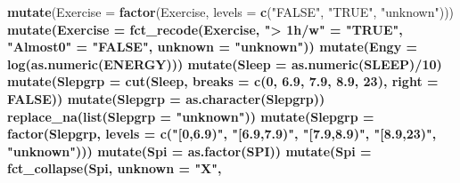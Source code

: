 \documentclass[]{article}
\newenvironment{Shaded}{\begin{snugshade}}{\end{snugshade}}
\newcommand{\CommentTok}[1]{\textcolor[rgb]{0.56,0.35,0.01}{\textit{#1}}}
\newcommand{\DataTypeTok}[1]{\textcolor[rgb]{0.13,0.29,0.53}{#1}}
\newcommand{\DecValTok}[1]{\textcolor[rgb]{0.00,0.00,0.81}{#1}}
\newcommand{\FloatTok}[1]{\textcolor[rgb]{0.00,0.00,0.81}{#1}}
\newcommand{\KeywordTok}[1]{\textcolor[rgb]{0.13,0.29,0.53}{\textbf{#1}}}
\newcommand{\NormalTok}[1]{#1}
\newcommand{\OperatorTok}[1]{\textcolor[rgb]{0.81,0.36,0.00}{\textbf{#1}}}
\newcommand{\OtherTok}[1]{\textcolor[rgb]{0.56,0.35,0.01}{#1}}
\newcommand{\StringTok}[1]{\textcolor[rgb]{0.31,0.60,0.02}{#1}}
\begin{document}
\begin{Shaded}
\begin{Highlighting}[]
{{{{{{{{{{{{{{{{{{{{{{{{{{{{{\StringTok{  }\KeywordTok{mutate}\NormalTok{(}\DataTypeTok{Exercise =} \KeywordTok{factor}\NormalTok{(Exercise, }\DataTypeTok{levels =} \KeywordTok{c}\NormalTok{(}\StringTok{"FALSE"}\NormalTok{, }\StringTok{"TRUE"}\NormalTok{, }\StringTok{"unknown"}\NormalTok{))) }\OperatorTok{%
\StringTok{  }\KeywordTok{mutate}\NormalTok{(}\DataTypeTok{Exercise =} \KeywordTok{fct_recode}\NormalTok{(Exercise, }
                               \StringTok{"> 1h/w"}\NormalTok{ =}\StringTok{ "TRUE"}\NormalTok{, }
                               \StringTok{"Almost0"}\NormalTok{ =}\StringTok{ "FALSE"}\NormalTok{, }
                               \DataTypeTok{unknown   =} \StringTok{"unknown"}\NormalTok{)) }\OperatorTok{%
\StringTok{  }\KeywordTok{mutate}\NormalTok{(}\DataTypeTok{Engy =} \KeywordTok{log}\NormalTok{(}\KeywordTok{as.numeric}\NormalTok{(ENERGY))) }\OperatorTok{%
\StringTok{  }\KeywordTok{mutate}\NormalTok{(}\DataTypeTok{Sleep =} \KeywordTok{as.numeric}\NormalTok{(SLEEP)}\OperatorTok{/}\DecValTok{10}\NormalTok{) }\OperatorTok{%
\StringTok{  }\KeywordTok{mutate}\NormalTok{(}\DataTypeTok{Slepgrp =} \KeywordTok{cut}\NormalTok{(Sleep, }\DataTypeTok{breaks =} \KeywordTok{c}\NormalTok{(}\DecValTok{0}\NormalTok{, }\FloatTok{6.9}\NormalTok{, }\FloatTok{7.9}\NormalTok{, }\FloatTok{8.9}\NormalTok{, }\DecValTok{23}\NormalTok{), }\DataTypeTok{right =} \OtherTok{FALSE}\NormalTok{)) }\OperatorTok{%
\StringTok{  }\KeywordTok{mutate}\NormalTok{(}\DataTypeTok{Slepgrp =} \KeywordTok{as.character}\NormalTok{(Slepgrp)) }\OperatorTok{%
\StringTok{  }\KeywordTok{replace_na}\NormalTok{(}\KeywordTok{list}\NormalTok{(}\DataTypeTok{Slepgrp =} \StringTok{"unknown"}\NormalTok{)) }\OperatorTok{%
\StringTok{  }\KeywordTok{mutate}\NormalTok{(}\DataTypeTok{Slepgrp =} \KeywordTok{factor}\NormalTok{(Slepgrp, }\DataTypeTok{levels =} \KeywordTok{c}\NormalTok{(}\StringTok{"[0,6.9)"}\NormalTok{,}
                                            \StringTok{"[6.9,7.9)"}\NormalTok{,}
                                            \StringTok{"[7.9,8.9)"}\NormalTok{, }
                                            \StringTok{"[8.9,23)"}\NormalTok{, }\StringTok{"unknown"}\NormalTok{))) }\OperatorTok{%
\StringTok{  }\KeywordTok{mutate}\NormalTok{(}\DataTypeTok{Spi =} \KeywordTok{as.factor}\NormalTok{(SPI)) }\OperatorTok{%
\StringTok{  }\KeywordTok{mutate}\NormalTok{(}\DataTypeTok{Spi =} \KeywordTok{fct_collapse}\NormalTok{(Spi, }
                            \DataTypeTok{unknown =} \StringTok{"X"}\NormalTok{, }
}}}}}}}}}}}}}}}}}}}}}}}}}}}}}}}}}}}}}}
\end{Highlighting}
\end{Shaded}
\end{document}
